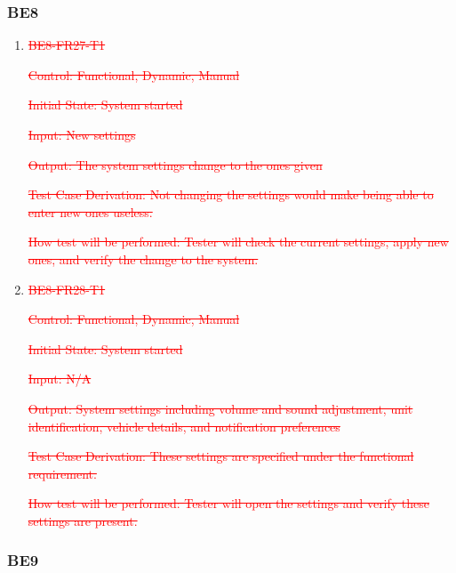 \documentclass[12pt, titlepage]{article}
\begin{document}
\subsubsection{BE8}

\begin{enumerate}
    
    \item{\textcolor{red}{\st{BE8-FR27-T1}}}

    \textcolor{red}{\st{Control: Functional, Dynamic, Manual}}
    					
    \textcolor{red}{\st{Initial State: System started}}
    					
    \textcolor{red}{\st{Input: New settings}}
    					
    \textcolor{red}{\st{Output: The system settings change to the ones given}}
    
    \textcolor{red}{\st{Test Case Derivation: Not changing the settings would
    make being able to enter new ones useless.}}
    					
    \textcolor{red}{\st{How test will be performed: Tester will check the
    current settings, apply new ones, and verify the change to the system.}}

    \item{\textcolor{red}{\st{BE8-FR28-T1}}}

    \textcolor{red}{\st{Control: Functional, Dynamic, Manual}}
    					
    \textcolor{red}{\st{Initial State: System started}}
    					
    \textcolor{red}{\st{Input: N/A}}
    					
    \textcolor{red}{\st{Output: System settings including volume and sound
    adjustment, unit identification, vehicle details, and notification
    preferences}}
    
    \textcolor{red}{\st{Test Case Derivation: These settings are specified under
    the functional requirement.}}
    					
    \textcolor{red}{\st{How test will be performed: Tester will open the
    settings and verify these settings are present.}}
\end{enumerate}

\subsubsection{BE9}
\end{document}
